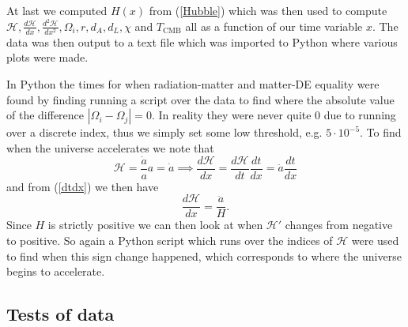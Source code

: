 \documentclass[%
reprint,
 amsmath,amssymb,
 aps,
]{revtex4-2}
\newcommand{\Hp}{\mathcal{H}}
\begin{document}
At last we computed $H(x)$ from (\ref{Hubble}) which was then used to compute $\Hp,\frac{d\Hp}{dx},\frac{d^2\Hp}{dx^2},\Omega_i,r,d_A,d_L,\chi$ and $T_{\text{CMB}}$ all as a function of our time variable $x$. The data was then output to a text file which was imported to Python where various plots were made.

In Python the times for when radiation-matter and matter-DE equality were found by finding running a script over the data to find where the absolute value of the difference $|\Omega_i-\Omega_j|=0$. In reality they were never quite 0 due to running over a discrete index, thus we simply set some low threshold, e.g. $5\cdot10^{-5}$. To find when the universe accelerates we note that
\[\Hp=\frac{\dot a}{a}a=\dot a\implies \frac{d\Hp}{dx}=\frac{d\Hp}{dt}\frac{dt}{dx}=\ddot{a}\frac{dt}{dx}\]
and from (\ref{dtdx}) we then have
\[\frac{d\Hp}{dx}=\frac{\ddot a}{H}.\]
Since $H$ is strictly positive we can then look at when $\Hp'$ changes from negative to positive. So again a Python script which runs over the indices of $\Hp$ were used to find when this sign change happened, which corresponds to where the universe begins to accelerate. 

\subsection{Tests of data}
\end{document}
